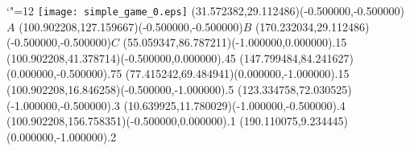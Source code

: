 \documentclass[12pt]{article}
\begin{document}
\makeatletter%
\let\ASYencoding\f@encoding%
\let\ASYfamily\f@family%
\let\ASYseries\f@series%
\let\ASYshape\f@shape%
\makeatother%
{\catcode`"=12%
\texttt{[image: simple\_game\_0.eps]}%
}%
\kern -200.750000pt%
\color{ASYcolor}
\fontsize{12.000000}{14.400000}\selectfont
\usefont{\ASYencoding}{\ASYfamily}{\ASYseries}{\ASYshape}%
\ASYalign(31.572382,29.112486)(-0.500000,-0.500000){$A$}%
\color{ASYcolor}
\fontsize{12.000000}{14.400000}\selectfont
\ASYalign(100.902208,127.159667)(-0.500000,-0.500000){$B$}%
\color{ASYcolor}
\fontsize{12.000000}{14.400000}\selectfont
\ASYalign(170.232034,29.112486)(-0.500000,-0.500000){$C$}%
\color{ASYcolor}
\fontsize{12.000000}{14.400000}\selectfont
\ASYalign(55.059347,86.787211)(-1.000000,0.000000){.15}%
\color{ASYcolor}
\fontsize{12.000000}{14.400000}\selectfont
\ASYalign(100.902208,41.378714)(-0.500000,0.000000){.45}%
\color{ASYcolor}
\fontsize{12.000000}{14.400000}\selectfont
\ASYalign(147.799484,84.241627)(0.000000,-0.500000){.75}%
\color{ASYcolor}
\fontsize{12.000000}{14.400000}\selectfont
\ASYalign(77.415242,69.484941)(0.000000,-1.000000){.15}%
\color{ASYcolor}
\fontsize{12.000000}{14.400000}\selectfont
\ASYalign(100.902208,16.846258)(-0.500000,-1.000000){.5}%
\color{ASYcolor}
\fontsize{12.000000}{14.400000}\selectfont
\ASYalign(123.334758,72.030525)(-1.000000,-0.500000){.3}%
\color{ASYcolor}
\fontsize{12.000000}{14.400000}\selectfont
\ASYalign(10.639925,11.780029)(-1.000000,-0.500000){.4}%
\color{ASYcolor}
\fontsize{12.000000}{14.400000}\selectfont
\ASYalign(100.902208,156.758351)(-0.500000,0.000000){.1}%
\color{ASYcolor}
\fontsize{12.000000}{14.400000}\selectfont
\ASYalign(190.110075,9.234445)(0.000000,-1.000000){.2}%
\end{document}
